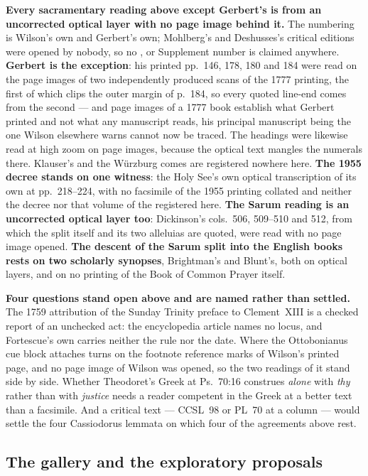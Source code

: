 \textbf{Every sacramentary reading above except Gerbert's is from an uncorrected
optical layer with no page image behind it.} The numbering is Wilson's own and
Gerbert's own; Mohlberg's and Deshusses's critical editions were opened by
nobody, so no ,  or Supplement number is claimed anywhere.
\textbf{Gerbert is the exception}: his printed pp.~146, 178, 180 and 184 were
read on the page images of two independently produced scans of the 1777
printing, the first of which clips the outer margin of p.~184, so every quoted
line-end comes from the second --- and page images of a 1777 book establish what
Gerbert printed and not what any manuscript reads, his principal manuscript
being the one Wilson elsewhere warns cannot now be traced. The  headings were likewise read at high zoom on page images, because the
optical text mangles the numerals there. Klauser's  and the Würzburg comes are registered nowhere here. \textbf{The
1955 decree stands on one witness}: the Holy See's own optical transcription of
its own  at pp.~218--224, with no facsimile of the 1955 printing
collated and neither the decree nor that volume of the  registered
here. \textbf{The Sarum reading is an uncorrected optical layer too}: Dickinson's
cols.\ 506, 509--510 and 512, from which the split itself and its two alleluias
are quoted, were read with no page image opened. \textbf{The descent of the
Sarum split into the English books rests on two scholarly synopses}, Brightman's
and Blunt's, both on optical layers, and on no printing of the Book of Common
Prayer itself.

\textbf{Four questions stand open above and are named rather than settled.} The
1759 attribution of the Sunday Trinity preface to Clement~XIII is a checked
report of an unchecked act: the encyclopedia article names no  locus,
and Fortescue's own  carries neither the rule nor the date. Where
the Ottobonianus cue block attaches turns on the footnote reference marks of
Wilson's printed page, and no page image of Wilson was opened, so the two
readings of it stand side by side. Whether Theodoret's Greek at Ps.~70:16
construes \emph{alone} with \emph{thy} rather than with \emph{justice} needs a
reader competent in the Greek at a better text than a facsimile. And a critical
text --- CCSL~98 or PL~70 at a column --- would settle the four Cassiodorus
lemmata on which four of the agreements above rest.

\subsection*{The gallery and the exploratory proposals}

